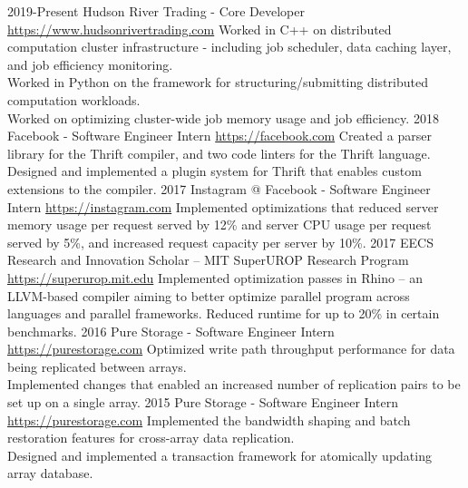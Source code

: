 \documentclass[__VERSION__]{friggeri-cv} %
\begin{document}
\begin{entrylist}
  \entry
  {2019-Present}
  {Hudson River Trading - Core Developer}
  {\href{https://www.hudsonrivertrading.com}{https://www.hudsonrivertrading.com}}
  {Worked in C++ on distributed computation cluster infrastructure - including job scheduler, data caching layer, and job efficiency monitoring. \\
  Worked in Python on the framework for structuring/submitting distributed computation workloads. \\
  Worked on optimizing cluster-wide job memory usage and job efficiency.}
  \entry
  {2018}
  {Facebook - Software Engineer Intern}
  {\href{https://facebook.com}{https://facebook.com}}
  {Created a parser library for the Thrift compiler, and two code linters for the Thrift language. \\
  Designed and implemented a plugin system for Thrift that enables custom extensions to the compiler. }
  \entry
  {2017}
  {Instagram @ Facebook - Software Engineer Intern}
  {\href{https://instagram.com}{https://instagram.com}}
  {Implemented optimizations that reduced server memory usage per request served by 12\% and server CPU usage per request served by 5\%, and increased request capacity per server by 10\%. }
  \entry
  {2017}
  {EECS Research and Innovation Scholar – MIT SuperUROP Research Program}
  {\href{https://superurop.mit.edu}{https://superurop.mit.edu}}
  {Implemented optimization passes in Rhino – an LLVM-based compiler aiming to better optimize parallel program across languages and parallel frameworks. Reduced runtime for up to 20\% in certain benchmarks.}
  \entry
  {2016}
  {Pure Storage - Software Engineer Intern}
  {\href{https://purestorage.com}{https://purestorage.com}}
  {Optimized write path throughput performance for data being replicated between arrays. \\
  Implemented changes that enabled an increased number of replication pairs to be set up on a single array. }
  \entry
  {2015}
  {Pure Storage - Software Engineer Intern}
  {\href{https://purestorage.com}{https://purestorage.com}}
  {Implemented the bandwidth shaping and batch restoration features for cross-array data replication. \\
  Designed and implemented a transaction framework for atomically updating array database. }

\end{entrylist}
\end{document}
